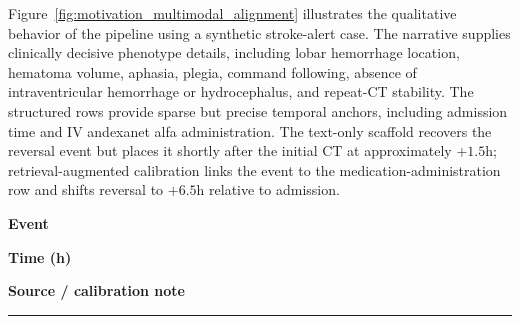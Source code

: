 Figure~\ref{fig:motivation_multimodal_alignment} illustrates the qualitative behavior of the pipeline using a synthetic stroke-alert case. The narrative supplies clinically decisive phenotype details, including lobar hemorrhage location, hematoma volume, aphasia, plegia, command following, absence of intraventricular hemorrhage or hydrocephalus, and repeat-CT stability. The structured rows provide sparse but precise temporal anchors, including admission time and IV andexanet alfa administration. The text-only scaffold recovers the reversal event but places it shortly after the initial CT at approximately \(+1.5\)h; retrieval-augmented calibration links the event to the medication-administration row and shifts reversal to \(+6.5\)h relative to admission.

\begin{tcolorbox}[
    breakable,
    colback=white,
    colframe=black!45,
    title=\textbf{Pipeline output: calibrated event timeline},
    fonttitle={\fontsize{8pt}{11pt}\selectfont\bfseries}
]
\scriptsize
\setlength{\parindent}{0pt}

\newcommand{\vignetteRow}[3]{%
\noindent
\begin{minipage}[t]{0.47\linewidth}\raggedright #1\end{minipage}\hfill
\begin{minipage}[t]{0.10\linewidth}\raggedleft #2\end{minipage}\hfill
\begin{minipage}[t]{0.37\linewidth}\raggedright #3\end{minipage}\par\vspace{1.5pt}
}

\vspace{-6pt}

\noindent
\begin{minipage}[t]{0.47\linewidth}\raggedright \textbf{Event}\end{minipage}\hfill
\begin{minipage}[t]{0.10\linewidth}\raggedleft \textbf{Time (h)}\end{minipage}\hfill
\begin{minipage}[t]{0.37\linewidth}\raggedright \textbf{Source / calibration note}\end{minipage}

\vspace{2pt}
\hrule
\vspace{3pt}


\end{tcolorbox}
